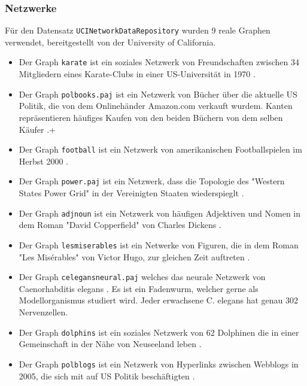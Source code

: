 \documentclass[12pt,a4paper,onecolumn,oneside,titlepage]{article}
\newcommand{\vars}{\texttt}
\begin{document}
\subsubsection{Netzwerke}
Für den Datensatz \vars{UCINetworkDataRepository} wurden 9 reale Graphen verwendet, bereitgestellt von der University of California.
\begin{itemize}
\item Der Graph \vars{karate} ist ein soziales Netzwerk von Freundschaften zwischen 34 Mitgliedern eines Karate-Clubs in einer US-Universität in 1970 \cite{Zachary77}.
\item Der Graph \vars{polbooks.paj} ist ein Netzwerk von Bücher über die aktuelle US Politik, die von dem Onlinehänder Amazon.com verkauft wurdem. Kanten repräsentieren häufiges Kaufen von den beiden Büchern von dem selben Käufer \cite{polbooks}.+

\item Der Graph \vars{football} ist ein Netzwerk von amerikanischen Footballspielen im Herbst 2000 \cite{Girvan02}.

\item Der Graph \vars{power.paj} ist ein Netzwerk, dass die Topologie des "Western States Power Grid" in der Vereinigten Staaten wiederspieglt  \cite{Watts98}.

\item Der Graph \vars{adjnoun} ist ein Netzwerk von häufigen Adjektiven und Nomen in dem Roman "David Copperfield" von Charles Dickens \cite{Newman06}.

\item Der Graph \vars{lesmiserables} ist ein Netwerke von Figuren, die in dem  Roman "Les Misérables" von Victor Hugo, zur gleichen Zeit auftreten \cite{Knuth93}. 


\item Der Graph \vars{celegansneural.paj} welches das neurale Netzwerk von Caenorhabditis elegans \cite{Watts98}. Es ist ein Fadenwurm, welcher gerne als Modellorganismus studiert wird. Jeder erwachsene C. elegans hat genau 302 Nervenzellen.


\item Der Graph \vars{dolphins} ist ein soziales Netzwerk von 62 Dolphinen die in einer Gemeinschaft in der Nähe von Neuseeland leben \cite{Lusseau03}. 

\item Der Graph \vars{polblogs} ist ein Netzwerk von Hyperlinks zwischen Webblogs in 2005, die sich mit auf US Politik beschäftigten \cite{Adamic05}.
\end{itemize}
\end{document}
